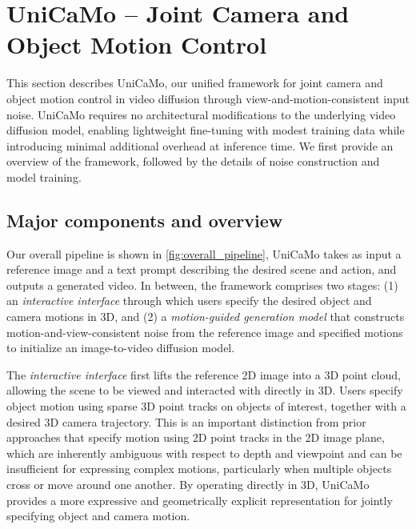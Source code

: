 \ifdefined\arxivbuild\else\documentclass{article}\fi %
\begin{document}

\section{UniCaMo -- Joint Camera and Object Motion Control}
\label{sec:method}

This section describes UniCaMo, our unified framework for joint camera and object motion control in video diffusion through view-and-motion-consistent input noise. UniCaMo requires no architectural modifications to the underlying video diffusion model, enabling lightweight fine-tuning with modest training data while introducing minimal additional overhead at inference time. We first provide an overview of the framework, followed by the details of noise construction and model training.

\subsection{Major components and overview}
Our overall pipeline is shown in \cref{fig:overall_pipeline}, UniCaMo takes as input a reference image and a text prompt describing the desired scene and action, and outputs a generated video. In between, the framework comprises two stages: (1) an \emph{interactive interface} through which users specify the desired object and camera motions in 3D, and (2) a \emph{motion-guided generation model} that constructs motion-and-view-consistent noise from the reference image and specified motions to initialize an image-to-video diffusion model.

The \emph{interactive interface} first lifts the reference 2D image into a 3D point cloud, allowing the scene to be viewed and interacted with directly in 3D. Users specify object motion using sparse 3D point tracks on objects of interest, together with a desired 3D camera trajectory. This is an important distinction from prior approaches that specify motion using 2D point tracks in the 2D image plane, which are inherently ambiguous with respect to depth and viewpoint and can be insufficient for expressing complex motions, particularly when multiple objects cross or move around one another. By operating directly in 3D, UniCaMo provides a more expressive and geometrically explicit representation for jointly specifying object and camera motion.
\end{document}
